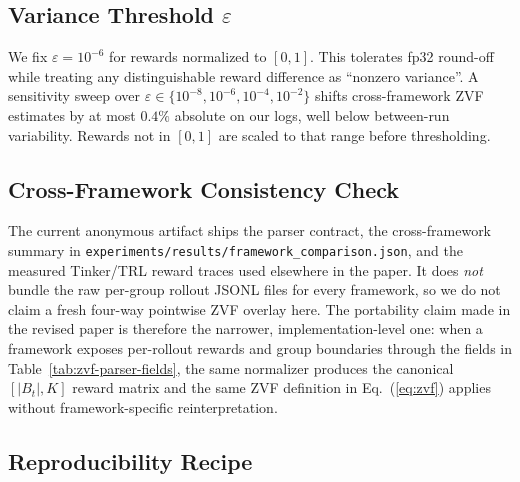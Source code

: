 \subsection{Variance Threshold $\varepsilon$}

We fix $\varepsilon = 10^{-6}$ for rewards normalized to $[0,1]$. This
tolerates fp32 round-off while treating any distinguishable reward
difference as ``nonzero variance''. A sensitivity sweep over
$\varepsilon \in \{10^{-8}, 10^{-6}, 10^{-4}, 10^{-2}\}$ shifts
cross-framework ZVF estimates by at most $0.4\%$ absolute on our logs,
well below between-run variability. Rewards not in $[0,1]$ are scaled to
that range before thresholding.

\subsection{Cross-Framework Consistency Check}

The current anonymous artifact ships the parser contract, the
cross-framework summary in
\texttt{experiments/results/framework\_comparison.json}, and the measured
Tinker/TRL reward traces used elsewhere in the paper. It does
\emph{not} bundle the raw per-group rollout JSONL files for every framework,
so we do not claim a fresh four-way pointwise ZVF overlay here. The
portability claim made in the revised paper is therefore the narrower,
implementation-level one: when a framework exposes per-rollout rewards and
group boundaries through the fields in Table~\ref{tab:zvf-parser-fields},
the same normalizer produces the canonical $[|B_t|, K]$ reward matrix and
the same ZVF definition in Eq.~(\ref{eq:zvf}) applies without
framework-specific reinterpretation.

\subsection{Reproducibility Recipe}

